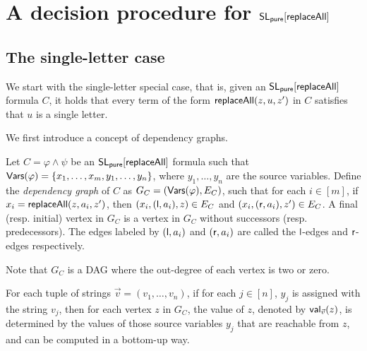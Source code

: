 \documentclass[sigplan,10pt,review,anonymous]{acmart}\settopmatter{printfolios=true}
\begin{document}
\section{A decision procedure for $\mathsf{SL_{pure}}[\mathsf{replaceAll}]$} \label{sec:replaceallpure}



\subsection{The single-letter case}

We start with the single-letter special case, that is, given an $\mathsf{SL_{pure}}[\mathsf{replaceAll}]$ formula $C$, it holds that every term of the form $\mathsf{replaceAll}(z, u, z')$ in $C$ satisfies that $u$ is a single letter.

We first introduce a concept of dependency graphs.

\begin{definition}
	Let $C= \varphi \wedge \psi$ be an $\mathsf{SL_{pure}}[\mathsf{replaceAll}]$ formula such that $\mathsf{Vars}(\varphi) = \{x_1,\dots, x_m, y_1, \dots, y_n\}$, where $y_1,\dots, y_n$ are the source variables. Define the \emph{dependency graph} of $C$ as $G_C= (\mathsf{Vars}(\varphi), E_C)$, such that for each $i \in [m]$, if $x_i = \mathsf{replaceAll}(z, a_i, z')$, then $(x_i, (\mathsf{l}, a_i), z) \in E_C$ and $(x_i, (\mathsf{r}, a_i), z') \in E_C$. A final (resp. initial) vertex in $G_C$ is a vertex in $G_C$ without successors (resp. predecessors). The edges labeled by $(\mathsf{l},a_i)$ and $(\mathsf{r}, a_i)$ are called the $\mathsf{l}$-edges and $\mathsf{r}$-edges respectively. 
\end{definition}
Note that $G_C$ is a DAG where the out-degree of each vertex is two or zero. 


For each tuple of strings $\vec{v}=(v_1,\dots, v_n)$, if for each $j \in [n]$, $y_j$ is assigned with the string $v_j$, then for each vertex $z$ in $G_C$, the value of $z$, denoted by $\mathsf{val}_{\vec{v}}(z)$, is determined by the values of those source variables $y_j$ that are reachable from $z$, and can be computed in a bottom-up way. 
\end{document}
